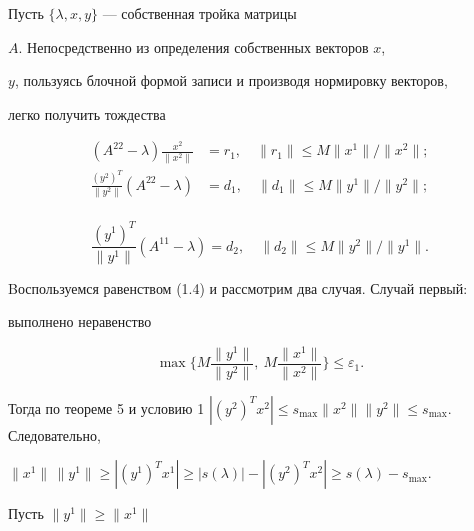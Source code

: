 \begin{pf}


Пусть $\{\lambda, x, y\}$ --- собственная тройка матрицы


$A$. Непосредственно из определения собственных векторов $x$,


$y$, пользуясь блочной формой записи и производя нормировку векторов,


легко получить тождества


\begin{equation}


\begin{split}


(A^{22}-\lambda)\frac{x^{2}}{\|x^{2}\|}&= r_1,\quad \|r_1\|\le M \|x^1\|/


\|x^{2}\|;\\


\frac{(y^{2})^T}{\|y^{2}\|}(A^{22}-\lambda)&= d_1,\quad \|d_1\|\le


M \|y^1\|/\|y^{2}\|;\\


\end{split}


\end{equation}


\begin{equation}


\frac{(y^{1})^T}{\|y^{1}\|}(A^{11}-\lambda)= d_2,\quad \|d_2\|\le


M \|y^2\|/\|y^{1}\|.


\end{equation}


Bоспользуемся равенством (1.4) и рассмотрим два случая. Случай первый:


выполнено неравенство


\begin{equation}


\max\bigg\{M\frac{\|y^1\|}{\|y^{2}\|},


\ M\frac{\|x^1\|}{\|x^{2}\|}\bigg\}\le\varepsilon_1.


\end{equation}


Тогда по теореме 5 и условию 1\; $|(y^2)^T x^2|\le s_{\max}\|x^2\|\|y^2\|\le


s_{\max}$. Следовательно,


$\|x^1\|\,\|y^1\|\ge |(y^1)^Tx^1|\ge


|s(\lambda)|-|(y^2)^T x^2|\ge  s(\lambda)-s_{\max}$.


Пусть $\|y^1\|\ge\|x^1\|$



\end{pf}
